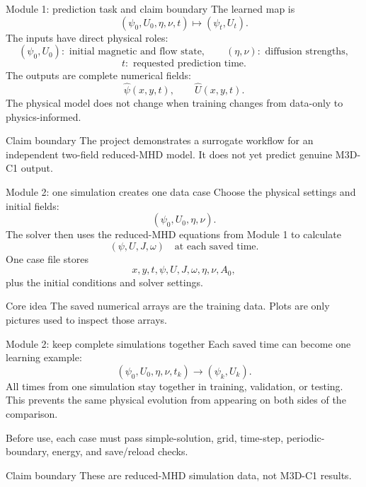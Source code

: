 \documentclass[aspectratio=169,11pt]{beamer}
\newcommand{\stateop}{(\psi_0,U_0,\eta,\nu,t)\mapsto(\psi_t,U_t)}
\newcommand{\currentmodule}{Module 1}
\newcommand{\moduleprogress}{1 of 4}
\newcommand{\setmodule}[2]{%
  \renewcommand{\currentmodule}{#1}%
  \renewcommand{\moduleprogress}{#2}%
}
\begin{document}
\setmodule{Module 1}{4 of 4}
\begin{frame}[t]{Module 1: prediction task and claim boundary}
\vspace{-0.15em}
The learned map is
\[
\boxed{\stateop.}
\]
The inputs have direct physical roles:
\[
(\psi_0,U_0):\text{ initial magnetic and flow state},
\qquad
(\eta,\nu):\text{ diffusion strengths},
\]
\[
t:\text{ requested prediction time}.
\]
The outputs are complete numerical fields:
\[
\widehat\psi(x,y,t),\qquad \widehat U(x,y,t).
\]
The physical model does not change when training changes from data-only to physics-informed.

\begin{alertblock}{Claim boundary}
The project demonstrates a surrogate workflow for an independent two-field reduced-MHD model. It does not yet predict genuine M3D-C1 output.
\end{alertblock}
\end{frame}


\setmodule{Module 2}{1 of 2}
\begin{frame}[t]{Module 2: one simulation creates one data case}
\vspace{-0.15em}
Choose the physical settings and initial fields:
\[
(\psi_0,U_0,\eta,\nu).
\]
The solver then uses the reduced-MHD equations from Module 1 to calculate
\[
(\psi,U,J,\omega)\quad\text{at each saved time.}
\]
One case file stores
\[
x, y, t, \psi, U, J, \omega, \eta, \nu, A_0,
\]
plus the initial conditions and solver settings.

\begin{block}{Core idea}
The saved numerical arrays are the training data. Plots are only pictures used to inspect those arrays.
\end{block}
\end{frame}

\setmodule{Module 2}{2 of 2}
\begin{frame}[t]{Module 2: keep complete simulations together}
\vspace{-0.15em}
Each saved time can become one learning example:
\[
\boxed{
(\psi_0,U_0,\eta,\nu,t_k)
\longrightarrow
(\psi_k,U_k).
}
\]
All times from one simulation stay together in training, validation, or testing. This prevents the same physical evolution from appearing on both sides of the comparison.

Before use, each case must pass simple-solution, grid, time-step, periodic-boundary, energy, and save/reload checks.

\begin{alertblock}{Claim boundary}
These are reduced-MHD simulation data, not M3D-C1 results.
\end{alertblock}
\end{frame}
\end{document}
